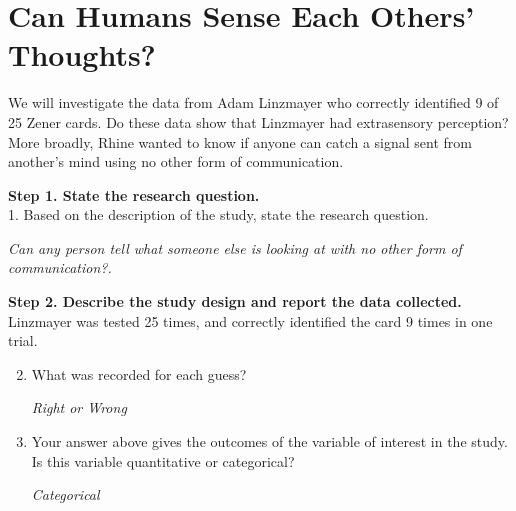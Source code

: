 \def\theTopic{ESP}
\def\dayNum{5}


\section { Can Humans Sense Each Others' Thoughts?}


  We will investigate the data from Adam Linzmayer who correctly
  identified 9 of 25 Zener cards.  Do these data show that
  Linzmayer had extrasensory perception?  More broadly, Rhine wanted
  to know if anyone can catch a signal sent from another's mind using
  no other form of communication.

{\bf Step 1. State the research question. }\\
1. Based on the description of the study, state the research question.
\begin{students}
  \vspace{2cm}
\end{students}

\begin{key}
{\it  Can any person tell what someone else is looking at with no
  other form of communication?.}
\end{key}



{\bf Step 2. Describe the study design and report the data collected.}\\
 Linzmayer was tested 25 times, and correctly identified the card 9
 times in one trial.\vspace{-.3cm}
 \begin{enumerate}
   \setcounter{enumi}{1}
   \item  What was recorded for each guess?
\begin{students}
  \vspace{1cm}
\end{students}

\begin{key}
{\it Right or Wrong}
\end{key}

\item Your answer above gives the outcomes of the variable of interest
  in the study.  Is this variable quantitative or categorical?
\begin{students}
  \vspace{1cm}
\end{students}

\begin{key}
{\it Categorical}
\end{key}
  
   \end{enumerate}
   
